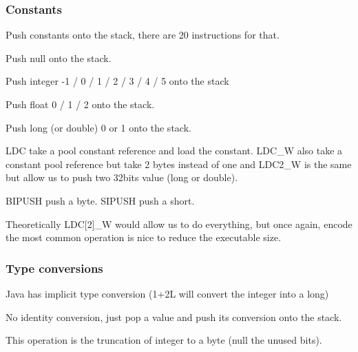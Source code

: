\subsubsection{Constants}
    Push constants onto the stack, there are 20 instructions for that.
    \theoremstyle{definition}
    \begin{definition}
        Push null onto the stack.
    \end{definition}
    \theoremstyle{definition}
    \begin{definition}[ICONST(\_M1/\_0/\_1/\_2/\_3/\_4/\_5)]
        Push integer -1 / 0 / 1 / 2 / 3 / 4 / 5 onto the stack
    \end{definition}
    \theoremstyle{definition}
    \begin{definition}[FCONST(\_0/\_1/\_2)]
        Push float 0 / 1 / 2 onto the stack.
    \end{definition}
    \theoremstyle{definition}
    \begin{definition}[(L/D)CONST(\_0/\_1)]
        Push long (or double) 0 or 1 onto the stack.
    \end{definition}
    \theoremstyle{definition}
    \begin{definition}
        LDC take a pool constant reference and load the constant. LDC\_W also
        take a constant pool reference but take 2 bytes instead of one and
        LDC2\_W is the same but allow us to push two 32bits value (long or
        double).
    \end{definition}
    \theoremstyle{definition}
    \begin{definition}
        BIPUSH push a byte. SIPUSH push a short.
    \end{definition}

    Theoretically LDC[2]\_W would allow us to do everything, but once again,
    encode the most common operation is nice to reduce the executable size.
\subsubsection{Type conversions}
Java has implicit type conversion (1+2L will convert the integer into a long)
\theoremstyle{definition}
\begin{definition}[(I/D/F/L)2(I/D/F/L)]
    No identity conversion, just pop a value and push its conversion onto the stack.
\end{definition}
\theoremstyle{definition}
\begin{definition}[I2(B/C/S)]
    This operation is the truncation of integer to a byte (null the unused bits).
\end{definition}

